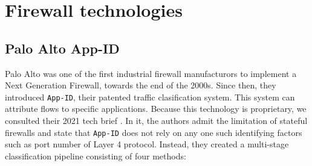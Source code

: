 \section{Firewall technologies}
\label{background:firewall}

\subsection{Palo Alto App-ID}

Palo Alto was one of the first industrial firewall manufacturors to implement a
Next Generation Firewall, towards the end of the 2000s. Since then, they
introduced \texttt{App-ID}, their patented traffic clasification system. This
system can attribute flows to specific applications. Because this technology is
proprietary, we consulted their 2021 tech brief \cite{paloalto2021appid}. In it,
the authors admit the limitation of stateful firewalls and state that
\texttt{App-ID} does not rely on any one such identifying factors such as
port number of Layer 4 protocol. Instead, they created a multi-stage classification
pipeline consisting of four methods:

